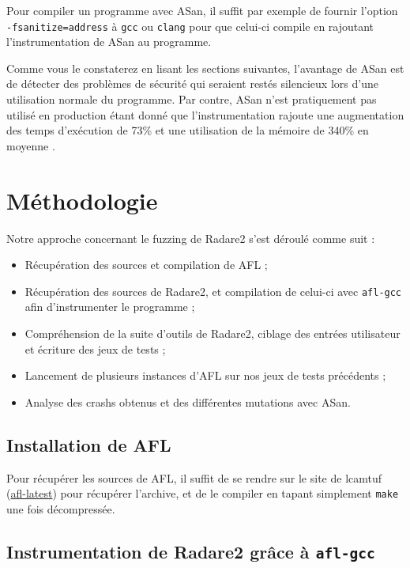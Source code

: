 Pour compiler un programme avec ASan, il suffit par exemple de fournir l'option \lstinline{-fsanitize=address} à \lstinline{gcc} ou \lstinline{clang} pour que celui-ci compile en rajoutant l'instrumentation de ASan au programme.

Comme vous le constaterez en lisant les sections suivantes, l'avantage de ASan est de détecter des problèmes de sécurité qui seraient restés silencieux lors d'une utilisation normale du programme.
Par contre, ASan n'est pratiquement pas utilisé en production étant donné que l'instrumentation rajoute une augmentation des temps d'exécution de 73\% et une utilisation de la mémoire de 340\% en moyenne \cite{asan}.

\section{Méthodologie}

Notre approche concernant le fuzzing de Radare2 s'est déroulé comme suit :

\begin{itemize}
\item Récupération des sources et compilation de AFL ;
\item Récupération des sources de Radare2, et compilation de celui-ci avec \lstinline{afl-gcc} afin d'instrumenter le programme ;
\item Compréhension de la suite d'outils de Radare2, ciblage des entrées utilisateur et écriture des jeux de tests ;
\item Lancement de plusieurs instances d'AFL sur nos jeux de tests précédents ;
\item Analyse des crashs obtenus et des différentes mutations avec ASan.
\end{itemize}

\subsection{Installation de AFL}

Pour récupérer les sources de AFL, il suffit de se rendre sur le site de lcamtuf (\href{http://lcamtuf.coredump.cx/afl/releases/afl-latest.tgz}{afl-latest}) pour récupérer l'archive, et de le compiler en tapant simplement \lstinline{make} une fois décompressée.

\subsection{Instrumentation de Radare2 grâce à \lstinline{afl-gcc}}

